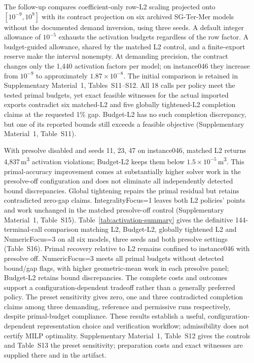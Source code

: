\documentclass[11pt]{article}
\theoremstyle{definition}
\theoremstyle{remark}
\begin{document}
The follow-up compares coefficient-only row-L2 scaling projected onto $[10^{-9},10^9]$
with its contract projection on six archived SG-Ter-Mer models without the documented
demand inversion, using three seeds. A default integer allowance of $10^{-5}$ exhausts
the activation budgets regardless of the row factor. A budget-guided allowance, shared
by the matched L2 control, and a finite-export reserve make the interval nonempty.
At demanding precision, the contract changes only the 1,440 activation factors per model;
on instance046 they increase from $10^{-9}$ to approximately $1.87\times10^{-8}$.
The initial comparison is retained in Supplementary Material~1, Tables~S11--S12.
All 18 calls per policy meet the tested primal budgets, yet exact feasible witnesses for
the actual imported exports contradict six matched-L2 and five globally tightened-L2
completion claims at the requested 1\% gap. Budget-L2 has no such completion discrepancy,
but one of its reported bounds still exceeds a feasible objective
(Supplementary Material~1, Table~S11).

With presolve disabled and seeds 11, 23, 47 on instance046, matched L2 returns
4,837\,m\textsuperscript{3} activation violations; Budget-L2 keeps them below
$1.5\times10^{-5}$\,m\textsuperscript{3}. This primal-accuracy improvement comes at
substantially higher solver work in the presolve-off configuration and does not
eliminate all independently detected bound discrepancies. Global tightening repairs the primal residual
but retains contradicted zero-gap claims. IntegralityFocus=1 leaves both L2 policies'
points and work unchanged in the matched presolve-off control (Supplementary
Material~1, Table~S15). Table~\ref{tab:activation-summary} gives the definitive
144-terminal-call comparison matching L2,
Budget-L2, globally tightened L2 and NumericFocus=3 on all six models, three seeds
and both presolve settings (Table~S16). Primal recovery relative to L2 remains
confined to instance046 with presolve off. NumericFocus=3 meets all primal budgets
without detected bound/gap flags, with higher geometric-mean work in each presolve
panel; Budget-L2 retains bound discrepancies. The complete costs and outcomes
support a configuration-dependent tradeoff rather than a generally preferred policy.
The preset sensitivity gives zero, one and three contradicted completion
claims among three demanding, reference and permissive runs respectively, despite
primal-budget compliance. These results establish a useful, configuration-dependent
representation choice and verification workflow; admissibility does not certify MILP
optimality. Supplementary Material~1, Table~S12 gives the controls and Table~S13
the preset sensitivity; preparation costs and exact witnesses are supplied there
and in the artifact.
\end{document}
